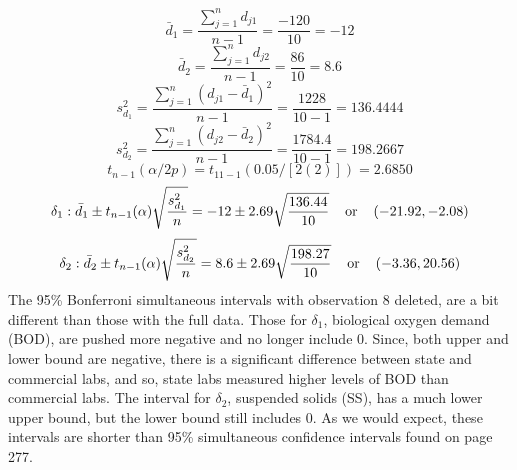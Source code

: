 \[
    \bar{d}_{1}
    =
    \frac{ \sum_{j=1}^{n}{ d_{j1} } }{n-1}
    =
    \frac{-120}{10}
    =
    -12
\]
\[
    \bar{d}_{2}
    =
    \frac{ \sum_{j=1}^{n}{ d_{j2} } }{n-1}
    =
    \frac{86}{10}
    =
    8.6
\]
\[
    s_{d_{1}}^{2}
    =
    \frac{ \sum_{j=1}^{n}{( d_{j1} - \bar{d}_{1} )}^{2} }{n-1}
    =
    \frac{1228}{10 - 1}
    =
    136.4444
\]
\[
    s_{d_{2}}^{2}
    =
    \frac{ \sum_{j=1}^{n}{( d_{j2} - \bar{d}_{2} )}^{2} }{n-1}
    =
    \frac{1784.4}{10 - 1}
    =
    198.2667
\]
\[
    t_{n-1}(\alpha/2p)
    =
    t_{11-1}(0.05/[2(2)])
    =
    2.6850
\]
\[
    \delta_{1}:
    \bar{d}_{1}
    \pm
    t_{n - 1}(\alpha)
    \sqrt{ \frac{ s_{d_{1}}^{2} }{n} }
    =
    -12
    \pm
    2.69
    \sqrt{ \frac{ 136.44 }{ 10 } }
    \hspace{0.4cm}\text{or}\hspace{0.4cm}
    (-21.92, -2.08)
\]
\[
    \delta_{2}:
    \bar{d}_{2}
    \pm
    t_{n - 1}(\alpha)
    \sqrt{ \frac{ s_{d_{2}}^{2} }{n} }
    =
    8.6
    \pm
    2.69
    \sqrt{ \frac{ 198.27 }{ 10 } }
    \hspace{0.4cm}\text{or}\hspace{0.4cm}
    (-3.36, 20.56)
\]
The 95\% Bonferroni simultaneous intervals with observation 8 deleted, are a bit different than those with the full data.
Those for $\delta_{1}$, biological oxygen demand (BOD), are pushed more negative and no longer include 0.
Since, both upper and lower bound are negative, there is a significant difference between state and commercial labs, and so, state labs measured higher levels of BOD than commercial labs.
The interval for $\delta_{2}$, suspended solids (SS), has a much lower upper bound, but the lower bound still includes 0.
As we would expect, these intervals are shorter than 95\% simultaneous confidence intervals found on page 277.